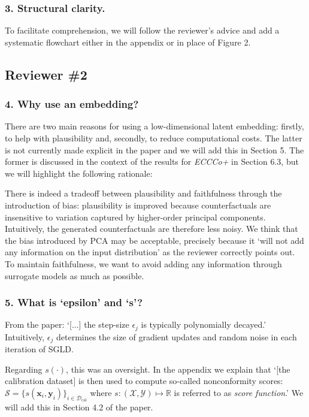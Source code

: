 \documentclass[letterpaper]{article} %
\begin{document}
\subsubsection{3. Structural clarity.} 

To facilitate comprehension, we will follow the reviewer's advice and add a systematic flowchart either in the appendix or in place of Figure 2.

\subsection*{Reviewer \#2}

\subsubsection{4. Why use an embedding?}

There are two main reasons for using a low-dimensional latent embedding: firstly, to help with plausibility and, secondly, to reduce computational costs. The latter is not currently made explicit in the paper and we will add this in Section 5. The former is discussed in the context of the results for \textit{ECCCo+} in Section 6.3, but we will highlight the following rationale:

There is indeed a tradeoff between plausibility and faithfulness through the introduction of bias: plausibility is improved because counterfactuals are insensitive to variation captured by higher-order principal components. Intuitively, the generated counterfactuals are therefore less noisy. We think that the bias introduced by PCA may be acceptable, precisely because it `will not add any information on the input distribution' as the reviewer correctly points out. To maintain faithfulness, we want to avoid adding any information through surrogate models as much as possible.

\subsubsection{5. What is `epsilon' and `s'?}

From the paper: `[...] the step-size $\epsilon_j$ is typically polynomially decayed.' Intuitively, $\epsilon_j$ determines the size of gradient updates and random noise in each iteration of SGLD.

Regarding $s(\cdot)$, this was an oversight. In the appendix we explain that `[the calibration dataset] is then used to compute so-called nonconformity scores: $\mathcal{S}=\{s(\mathbf{x}_i,\mathbf{y}_i)\}_{i \in \mathcal{D}_{\text{cal}}}$ where $s: (\mathcal{X},\mathcal{Y}) \mapsto \mathbb{R}$ is referred to as \textit{score function}.' We will add this in Section 4.2 of the paper. 
\end{document}
